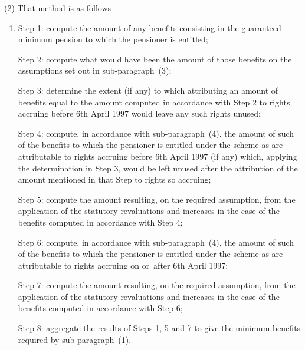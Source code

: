\documentclass[12pt,a4paper]{article}
\begin{document}
(2) That method is as follows—
\begin{enumerate}\item[]
    Step 1: compute the amount of any benefits consisting in the guaranteed minimum pension to which the pensioner is entitled;

    Step 2: compute what would have been the amount of those benefits on the assumptions set out in sub-paragraph~(3);

    Step 3: determine the extent (if any) to which attributing an amount of benefits equal to the amount computed in accordance with Step 2 to rights accruing before 6th April 1997 would leave any such rights unused;

    Step 4: compute, in accordance with sub-paragraph~(4), the amount of such of the benefits to which the pensioner is entitled under the scheme as are attributable to rights accruing before 6th April 1997 (if any) which, applying the determination in Step 3, would be left unused after the attribution of the amount mentioned in that Step to rights so accruing;

    Step 5: compute the amount resulting, on the required assumption, from the application of the statutory revaluations and increases in the case of the benefits computed in accordance with Step 4;

    Step 6: compute, in accordance with sub-paragraph~(4), the amount of such of the benefits to which the pensioner is entitled under the scheme as are attributable to rights accruing on or~after 6th April 1997;

    Step 7: compute the amount resulting, on the required assumption, from the application of the statutory revaluations and increases in the case of the benefits computed in accordance with Step 6;

    Step 8: aggregate the results of Steps 1, 5 and 7 to give the minimum benefits required by sub-paragraph~(1). 
\end{enumerate}
\end{document}
